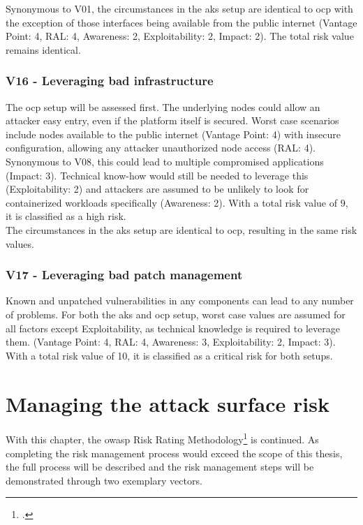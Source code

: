 Synonymous to V01, the circumstances in the \gls{aks} setup are identical to \gls{ocp} with the exception of those interfaces being available from the public internet (Vantage Point: 4, RAL: 4, Awareness: 2, Exploitability: 2, Impact: 2). 
The total risk value remains identical.

\subsection{V16 - Leveraging bad infrastructure}

The \gls{ocp} setup will be assessed first.
The underlying nodes could allow an attacker easy entry, even if the platform itself is secured.
Worst case scenarios include nodes available to the public internet (Vantage Point: 4) with insecure configuration, allowing any attacker unauthorized node access (RAL: 4). Synonymous to V08, this could lead to multiple compromised applications (Impact: 3). Technical know-how would still be needed to leverage this (Exploitability: 2) and attackers are assumed to be unlikely to look for containerized workloads specifically (Awareness: 2).
With a total risk value of 9, it is classified as a high risk. \\


The circumstances in the \gls{aks} setup are identical to \gls{ocp}, resulting in the same risk values.

\subsection{V17 - Leveraging bad patch management}


Known and unpatched vulnerabilities in any components can lead to any number of problems. For both the \gls{aks} and \gls{ocp} setup, worst case values are assumed for all factors except Exploitability, as technical knowledge is required to leverage them. (Vantage Point: 4, RAL: 4, Awareness: 3, Exploitability: 2, Impact: 3).
With a total risk value of 10, it is classified as a critical risk for both setups. \\

\chapter{Managing the attack surface risk}

With this chapter, the \gls{owasp} Risk Rating Methodology\footcite{riskRating} is continued. As completing the risk management process would exceed the scope of this thesis, the full process will be described and the risk management steps will be demonstrated through two exemplary vectors.

